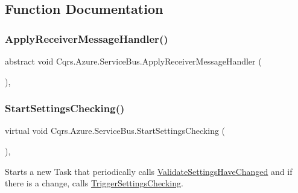 \subsection{Function Documentation}
\mbox{\label{namespaceCqrs_1_1Azure_1_1ServiceBus_a812c1b0eac09f5352b585f4ac55afeb2_a812c1b0eac09f5352b585f4ac55afeb2}} 
\subsubsection{\texorpdfstring{Apply\+Receiver\+Message\+Handler()}{ApplyReceiverMessageHandler()}}
{\footnotesize\ttfamily abstract void Cqrs.\+Azure.\+Service\+Bus.\+Apply\+Receiver\+Message\+Handler (\begin{DoxyParamCaption}{ }\end{DoxyParamCaption})\hspace{0.3cm}{\ttfamily [protected]}, {}}

\mbox{\label{namespaceCqrs_1_1Azure_1_1ServiceBus_a1ffbd6130b93b75aa96df68785095005_a1ffbd6130b93b75aa96df68785095005}} 
\subsubsection{\texorpdfstring{Start\+Settings\+Checking()}{StartSettingsChecking()}}
{\footnotesize\ttfamily virtual void Cqrs.\+Azure.\+Service\+Bus.\+Start\+Settings\+Checking (\begin{DoxyParamCaption}{ }\end{DoxyParamCaption})\hspace{0.3cm}{\ttfamily [protected]}, {\ttfamily [virtual]}}



Starts a new Task that periodically calls \hyperlink{namespaceCqrs_1_1Azure_1_1ServiceBus_aebfac0bf6d0753beaaea84b503e15d65_aebfac0bf6d0753beaaea84b503e15d65}{Validate\+Settings\+Have\+Changed} and if there is a change, calls \hyperlink{namespaceCqrs_1_1Azure_1_1ServiceBus_aa78bd82559437763c00791bd3a3b8f10_aa78bd82559437763c00791bd3a3b8f10}{Trigger\+Settings\+Checking}. 

